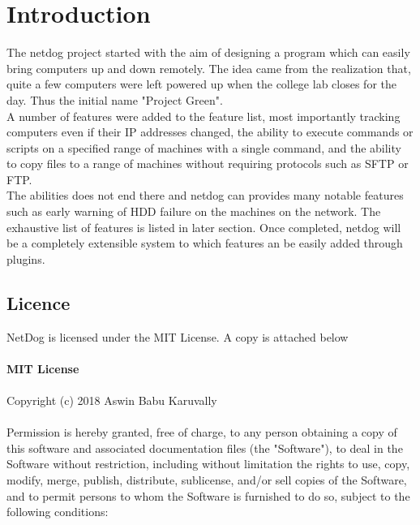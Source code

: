 \chapter{Introduction}
	
\par
The netdog project started with the aim of designing a program which can easily
bring computers up and down remotely. The idea came from the realization that,
quite a few computers were left powered up when the college lab closes for the
day. Thus the initial name "Project Green".\\

A number of features were added to the feature list, most importantly tracking
computers even if their IP addresses changed, the ability to execute commands
or scripts on a specified range of machines with a single command, and the
ability to copy files to a range of machines without requiring protocols such
as SFTP or FTP.\\

The abilities does not end there and netdog can provides many notable features
such as early warning of HDD failure on the machines on the network. The
exhaustive list of features is listed in later section. Once completed, netdog
will be a completely extensible system to which features an be easily added
through plugins.\\
\newpage 

\section{Licence}
NetDog is licensed under the MIT License. A copy is attached below\\\\

\textbf{MIT License}\\\\

Copyright (c) 2018 Aswin Babu Karuvally\\\\

Permission is hereby granted, free of charge, to any person obtaining a copy
of this software and associated documentation files (the "Software"), to deal
in the Software without restriction, including without limitation the rights
to use, copy, modify, merge, publish, distribute, sublicense, and/or sell
copies of the Software, and to permit persons to whom the Software is
furnished to do so, subject to the following conditions:\\\\

